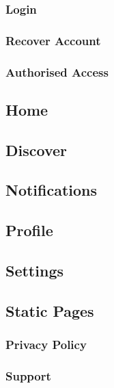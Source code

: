 \subsubsection{Login}
\subsubsection{Recover Account}
\subsubsection{Authorised Access}
\subsection{Home}
\subsection{Discover}
\subsection{Notifications}
\subsection{Profile}
\subsection{Settings}
\subsection{Static Pages}
\subsubsection{Privacy Policy}
\subsubsection{Support}